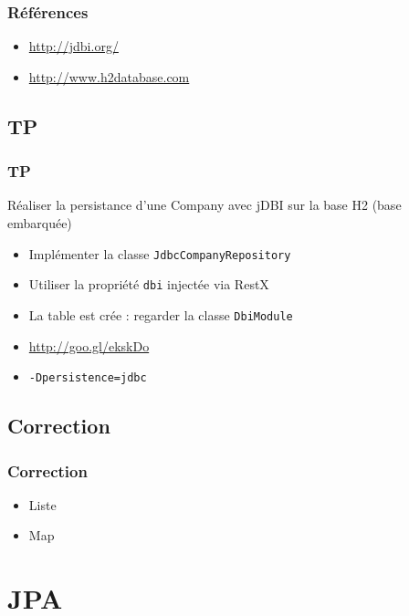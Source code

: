 \documentclass[t,12pt]{beamer}
\begin{document}
\begin{frame}
	\frametitle{R\'ef\'erences}

	\begin{itemize}
		\item \url{http://jdbi.org/}
		\item \url{http://www.h2database.com}
	\end{itemize}
\end{frame}

\subsection{TP}

\begin{frame}
	\frametitle{TP}

	\begin{block}{R\'ealiser la persistance d'une Company avec jDBI sur la base H2 (base embarqu\'ee)}
		\begin{itemize}
			\item Impl\'ementer la classe \lstinline{JdbcCompanyRepository}
			\item Utiliser la propri\'et\'e \lstinline{dbi} inject\'ee via RestX
			\item La table est cr\'ee : regarder la classe \lstinline{DbiModule}
			\item \url{http://goo.gl/ekskDo}
			\item \lstinline{-Dpersistence=jdbc}
		\end{itemize}
	\end{block}
\end{frame}

\subsection{Correction}
\begin{frame}
	\frametitle{Correction}
	\begin{itemize}
		\item Liste
		\item Map
	\end{itemize}
\end{frame}

\section{JPA}

\begin{frame}
	\tableofcontents[currentsection]
\end{frame}
\end{document}

